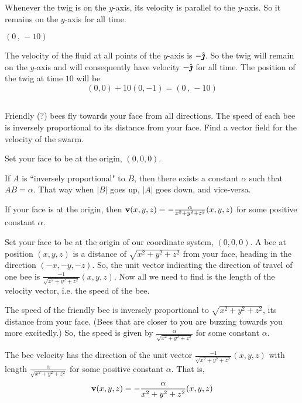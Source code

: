 \begin{hint} 
Whenever the twig is on the $y$-axis, its velocity is parallel to the $y$-axis.
So it remains on the $y$-axis for all time.
\end{hint}

\begin{answer} 
$(0\,,\,-10)$
\end{answer}

\begin{solution}
The velocity of the fluid at all points of the $y$-axis
is $-\hat{\pmb{\jmath}}$. So the twig will remain on the $y$-axis and will
consequently have velocity $-\hat{\pmb{\jmath}}$ for all time. The position
of the twig at time $10$ will be
\begin{equation*}
(0,0)+10(0,-1) = (0\,,\,-10)
\end{equation*}
\end{solution}


\subsection*{\Procedural}


\begin{question}
Friendly (?) bees fly towards your face from all directions. The  speed of each bee is inversely proportional to its distance from your face.  Find a vector field for the velocity of the swarm.
\end{question}

\begin{hint} 
Set your face to be at the origin, $(0,0,0)$. 

If $A$ is ``inversely proportional" to $B$, then there exists a constant $\alpha$ such that $AB=\alpha$. That way when $|B|$ goes up, $|A|$ goes down, and vice-versa.
\end{hint}

\begin{answer} 
If your face is at the origin, then $\mathbf{v}(x,y,z)=-\frac{\alpha}{{x^2+y^2+z^2}}(x,y,z)$ for some positive constant $\alpha$.
\end{answer}

\begin{solution}
Set your face to be at the origin of our coordinate system, $(0,0,0)$. A bee at position $(x,y,z)$ is a distance of $\sqrt{x^2+y^2+z^2}$ from your face, heading in the direction $(-x,-y,-z)$. So, the unit vector indicating the direction of travel of one bee is $\frac{-1}{\sqrt{x^2+y^2+z^2}}(x,y,z)$. Now all we need to find is the length of the velocity vector, i.e. the speed of the bee.

The speed of the friendly bee is inversely proportional to $\sqrt{x^2+y^2+z^2}$, its distance from your face. (Bees that are closer to you are buzzing towards you more excitedly.) So, the speed is given by $\frac{\alpha}{\sqrt{x^2+y^2+z^2}}$ for some constant $\alpha$. 

The bee velocity has the direction of the unit vector $\frac{-1}{\sqrt{x^2+y^2+z^2}}(x,y,z)$ with length  $\frac{\alpha}{\sqrt{x^2+y^2+z^2}}$ for some positive constant $\alpha$. That is,
\[\mathbf{v}(x,y,z)=-\frac{\alpha}{{x^2+y^2+z^2}}(x,y,z)\]
\end{solution}

